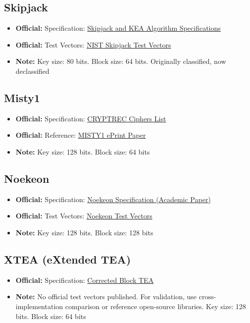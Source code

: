 \documentclass[12pt,a4paper]{article}
\newcommand{\official}[1]{\textcolor{citegreen}{\textbf{Official:}} #1}
\newcommand{\note}[1]{\textcolor{noteorange}{\textbf{Note:}} #1}
\newcommand{\link}[2]{\href{#1}{#2}}
\begin{document}
\subsection{Skipjack}
\begin{itemize}
    \item \official{Specification:} \link{https://csrc.nist.gov/csrc/media/projects/block-cipher-techniques/documents/bcm/comments/skipjack/skipjack.pdf}{Skipjack and KEA Algorithm Specifications}
    \item \official{Test Vectors:} \link{https://csrc.nist.gov/csrc/media/projects/block-cipher-techniques/documents/bcm/comments/skipjack/skipjack.pdf}{NIST Skipjack Test Vectors}
    \item \note{Key size: 80 bits. Block size: 64 bits. Originally classified, now declassified}
\end{itemize}

\subsection{Misty1}
\begin{itemize}
    \item \official{Specification:} \link{https://www.cryptrec.go.jp/list.html}{CRYPTREC Ciphers List}
    \item \official{Reference:} \link{https://eprint.iacr.org/2000/007.pdf}{MISTY1 ePrint Paper}
    \item \note{Key size: 128 bits. Block size: 64 bits}
\end{itemize}

\subsection{Noekeon}
\begin{itemize}
    \item \official{Specification:} \link{https://eprint.iacr.org/2000/067.pdf}{Noekeon Specification (Academic Paper)}
    \item \official{Test Vectors:} \link{https://eprint.iacr.org/2000/067.pdf}{Noekeon Test Vectors}
    \item \note{Key size: 128 bits. Block size: 128 bits}
\end{itemize}

\subsection{XTEA (eXtended TEA)}
\begin{itemize}
    \item \official{Specification:} \link{https://www.cix.co.uk/~klockstone/xtea.pdf}{Corrected Block TEA}
    \item \note{No official test vectors published. For validation, use cross-implementation comparison or reference open-source libraries. Key size: 128 bits. Block size: 64 bits}
\end{itemize}
\end{document}
